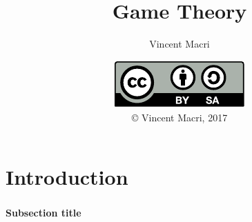 \documentclass[mathserif]{beamer}
\title{Game Theory}
\author{Vincent Macri}
\date{\includegraphics{../LicenseLogo}\\\copyright{} Vincent Macri, 2017}
\newenvironment{namedframe}[1]%
	{\begin{frame}\frametitle{\secname}\framesubtitle{#1}}
	{\end{frame}}
\begin{document}
	\frame{\titlepage}
	\section{Introduction}
	\begin{namedframe}{Subsection title}
	\end{namedframe}
\end{document}
